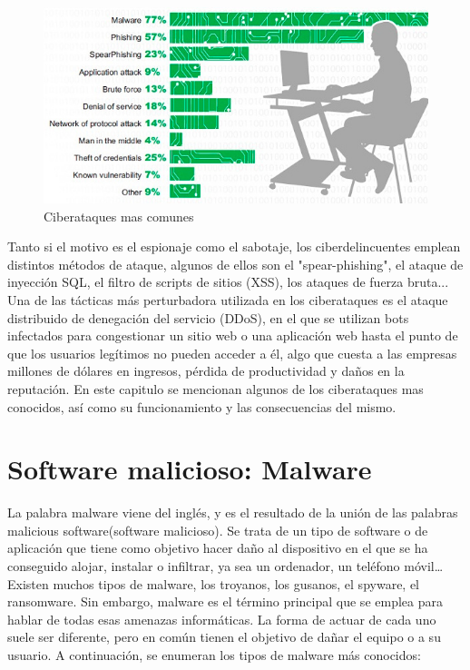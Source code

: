 \begin{figure}[tphb]
  		   \centering
     		   \includegraphics[width=5in]{ciberataques.png}
  		   \caption{Ciberataques mas comunes \cite{ciberataques}}
  		   \label{img:ciberataques}
\end{figure}

Tanto si el motivo es el espionaje como el sabotaje, los ciberdelincuentes emplean distintos métodos de ataque, algunos de ellos son el "spear-phishing",
 el ataque de inyección SQL, el filtro de scripts de sitios (XSS), los ataques de fuerza bruta... Una de las tácticas más perturbadora utilizada en los ciberataques 
es el ataque distribuido de denegación del servicio (DDoS), en el que se utilizan bots infectados para congestionar un sitio web o una aplicación web hasta el punto 
de que los usuarios legítimos no pueden acceder a él, algo que cuesta a las empresas millones de dólares en ingresos, pérdida de productividad y daños en la reputación.\nocite{akamai}
En este capitulo se mencionan algunos de los ciberataques mas conocidos, así como su funcionamiento y las consecuencias del mismo.

\section{Software malicioso: Malware}
\label{sec:malware}

La palabra malware viene del inglés, y es el resultado de la unión de las palabras malicious software(software malicioso). Se trata de un tipo de software o de aplicación que tiene como objetivo hacer daño al dispositivo en el que se ha conseguido alojar, instalar o infiltrar, ya sea un ordenador, un teléfono móvil… 
Existen muchos tipos de malware, los troyanos, los gusanos, el spyware, el ransomware. Sin embargo, malware es el término principal que se emplea para hablar de todas esas amenazas informáticas. La forma de actuar de cada uno suele ser diferente, pero en común tienen el objetivo de dañar el equipo o a su usuario. A continuación, se enumeran los tipos de malware más conocidos:

